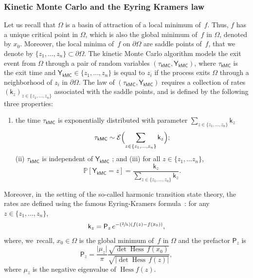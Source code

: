 \documentclass[10pt]{amsart}
\newenvironment{enumeratei}
{\bgroup\def\theenumi{\roman{enumi}}\def\theenumii{\arabic{enumii}}\begin{enumerate}}
{\end{enumerate}\egroup}
\newcommand{\Psfrac}[2]{(\sfrac{#1}{#2})}
\DeclareMathOperator{\hess}{Hess}\let\Hess\hess
\theoremstyle{plain}
\theoremstyle{definition}
\begin{document}
\subsubsection*{Kinetic Monte Carlo and the Eyring Kramers law}
Let us recall that $\Omega$ is a basin of attraction of a local
minimum of~$f$. Thus, $f$ has a unique critical point
in $\Omega$, which is also the global minimum of~$f$ in $\Omega$,
denoted by $x_0$. Moreover, the local minima of~$f$ on $\partial
\Omega$ are saddle points of~$f$, that we denote by $\{z_1, \ldots, z_n\} \subset \partial \Omega$. The kinetic
Monte Carlo algorithm models the exit event from $\Omega$ through a
pair of random variables $(\tau_{\mathsf {kMC}}, \mathsf Y_{\mathsf
{kMC}})$, where $\tau_{\mathsf{kMC}}$ is the exit time and $\mathsf
Y_{\mathsf {kMC}} \in \{z_1, \ldots, z_n\}$ is equal to $z_i$ if the
process exits $\Omega$ through a neighborhood of $z_i$ in $\partial
\Omega$. The law of $(\tau_{\mathsf {kMC}}, \mathsf Y_{\mathsf
{kMC}})$ requires a collection of rates $(\mathsf k_{z})_{z \in \{z_1,
\ldots, z_n\}}$ associated with
the saddle points, and is defined by the following three properties:
\begin{enumeratei}
\item
the time $ \tau_{\mathsf {kMC}}$ is exponentially distributed
with parameter $\sum_{z \in \{z_1,
\ldots, z_n\}} \mathsf k_{z}$
\begin{equation}\label{eq.k_temps}
\tau_{\mathsf {kMC}} \sim\mathcal E\Bigl(\sum_{z \in \{z_1,
\ldots, z_n\}} \mathsf k_{z}\Bigr);
\end{equation}
(ii) $\tau_{\mathsf {kMC}}$ is independent of $\mathsf Y_{\mathsf
{kMC}}$ ; and (iii) for all $z \in \{z_1, \ldots z_n\}$,
\begin{equation}\label{eq.YY}
\mathbb P[\mathsf Y_{\mathsf {kMC}}=z]= \frac{\mathsf k_{z}}{\sum_{z \in \{z_1,
\ldots, z_n\}} \mathsf k_{z}}.
\end{equation}
\end{enumeratei}
Moreover, in~the setting of the so-called harmonic transition state theory, the
rates are defined using the famous Eyring-Kramers
formula~\cite{hanggi-talkner-barkovec-90,voter-05}: for any $z \in
\{z_1, \ldots,z_n\}$,
\begin{equation}\label{eq.ek}
\mathsf k_{z}=\mathsf P_{z}\, e^{-\Psfrac 2h (f(z)-f(x_0))},
\end{equation}
where, we~recall, $x_0\in \Omega$ is the global minimum of~$f$ in
$\Omega$ and the prefactor $\mathsf P_{z}$ is
\begin{equation}\label{eq.prefactor}
\mathsf P_{z}=\frac{\vert \mu_{z}\vert}{\pi }\frac{ \sqrt{{\det\Hess}\, f (x_0) } }{ \sqrt{\vert {\det \Hess}\, f(z) \vert } },
\end{equation}
where $\mu_{z}$ is the negative eigenvalue of $\hess f(z)$.
\end{document}
